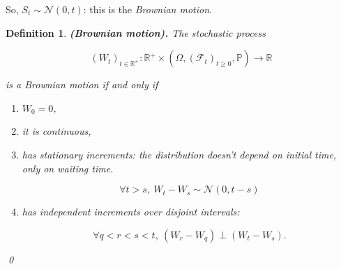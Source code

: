 \documentclass[oneside,titlepage,headinclude,12pt,a4paper,BCOR5mm,footinclude]{book}
\theoremstyle{defn}
\newtheorem{defn}{Definition}
\begin{document}
So, $S_t \sim \mathcal{N}(0,t)$: this is the \textit{Brownian motion}.

\begin{defn} 
  \textbf{(Brownian motion).} The stochastic process 

  \[
    (W_t)_{t\in\mathbb{R}^+} : \mathbb{R}^+ \times (\Omega, (\mathcal{F}_t)_{t \geq 0}, \mathbb{P}) \to \mathbb{R}
  \]

  is a Brownian motion if and only if

  \begin{enumerate}[label=(\Roman*)]
    \item $W_0 = 0$,
    \item it is continuous,
    \item  has  stationary  increments:  the distribution  doesn't  depend  on
           initial time, only on waiting time.
      
      $$\forall t > s,\ W_t - W_s \sim \mathcal{N}(0,t-s)$$

    \item has independent increments over disjoint intervals: 
      
      $$\forall q < r < s < t,\ (W_r-W_q) \perp (W_t-W_s).$$
  \end{enumerate}
  \qed
\end{defn}

\end{document}
